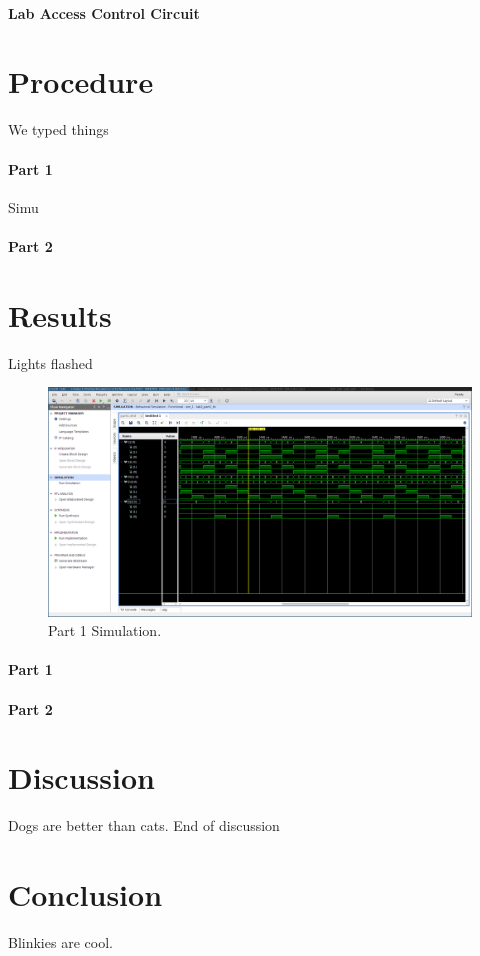 \documentclass{article}
\begin{document}
    \paragraph{Lab Access Control Circuit}

    \section{Procedure}
    We typed things

    \paragraph{Part 1}

    Simu

    \paragraph{Part 2}


    \section{Results}
    Lights flashed

    \begin{figure}[b!]
        \includegraphics[width=\linewidth]{MUX_DEMUX.png}
        \caption{Part 1 Simulation.}
        \label{fig:part1_sim}
    \end{figure}

    \paragraph{Part 1}


    \paragraph{Part 2}


    \section{Discussion}
    Dogs are better than cats.
    End of discussion

    \section{Conclusion}
    Blinkies are cool.
\end{document}
